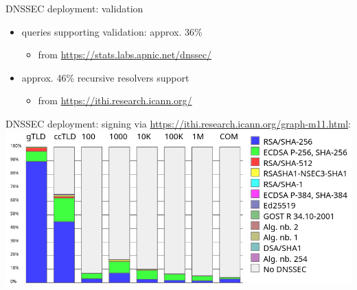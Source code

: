 

\begin{frame}{DNSSEC deployment: validation}
    \begin{itemize}
    \item queries supporting validation: approx. 36\%
        \begin{itemize}
        \item from \url{https://stats.labs.apnic.net/dnssec/}
        \end{itemize}
    \item approx. 46\% recursive resolvers support 
        \begin{itemize}
        \item from \url{https://ithi.research.icann.org/}
        \end{itemize}
    \end{itemize}
\end{frame}

\begin{frame}{DNSSEC deployment: signing}
via {\small\url{https://ithi.research.icann.org/graph-m11.html}}: \\
\includegraphics[height=0.8\textheight]{../dns/ithi-dnssec-deploy-oct-domains}
\end{frame}
